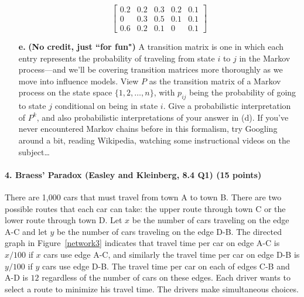 \documentclass[11pt]{article}
\begin{document}
\begin{itemize}
$$\begin{bmatrix}
      0.2 & 0.2 & 0.3 & 0.2 & 0.1 \\
      0 & 0.3 & 0.5 & 0.1 & 0.1 \\
      0.6 & 0.2 & 0.1 & 0 & 0.1
    \end{bmatrix}
    $$
  \item[\textbf{e.}] \textbf{(No credit, just ``for fun")} A transition matrix is one in which each entry represents the probability of traveling from state $i$ to $j$ in the Markov process---and we'll be covering transition matrices more thoroughly as we move into influence models. View $P$ as the transition matrix of a Markov process on the state space $\{1,2,\ldots,n\}$, with $p_{ij}$ being the probability of going to state $j$ conditional on being in state $i$. Give a probabilistic interpretation of $P^k$, and also probabilistic interpretations of your answer in (d).
    If you've never encountered Markov chains before in this formalism, try Googling around a bit, reading Wikipedia, watching some instructional videos on the subject\ldots\end{itemize}

\paragraph{4. Braess' Paradox  (Easley and Kleinberg, 8.4 Q1) (15 points)}

There are 1,000 cars that must travel from town A to town B. There are two possible
routes that each car can take: the upper route through town C or the lower route
through town D. Let $x$ be the number of cars traveling on the edge A-C and let $y$
be the number of cars traveling on the edge D-B. The directed graph in Figure~\ref{network3}
indicates that travel time per car on edge A-C is $x/100$ if $x$ cars use edge A-C, and
similarly the travel time per car on edge D-B is $y/100$ if $y$ cars use edge D-B. The
travel time per car on each of edges C-B and A-D is $12$ regardless of the number of
cars on these edges. Each driver wants to select a route to minimize his travel time.
The drivers make simultaneous choices.
\end{document}

